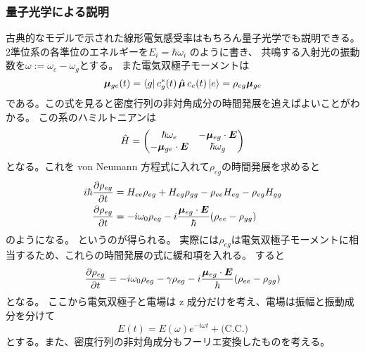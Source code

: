 \documentclass[11pt,dvipdfmx,a4paper]{jsarticle}
\newcommand{\cc}{\text{(C.C.)}}
\begin{document}
\subsubsection{量子光学による説明}
古典的なモデルで示された線形電気感受率はもちろん量子光学でも説明できる。
2準位系の各準位のエネルギーを\(E_i = \hbar \omega_i\) のように書き、
共鳴する入射光の振動数を\(\omega := \omega_e -\omega_g\)とする。
また電気双極子モーメントは
\begin{equation}
	\vb*{\mu}_{ge}(t) = \bra{g}c_g^*(t)\,\hat{\vb*{\mu}}\,c_e(t)\ket{e}
	= \rho_{eg}\vb*{\mu}_{ge}
\end{equation}
である。この式を見ると密度行列の非対角成分の時間発展を追えばよいことがわかる。
この系のハミルトニアンは
\begin{equation}
	\hat{H} =
	\begin{pmatrix}
		\hbar \omega_e  & -\vb*{\mu}_{eg}\cdot\vb*{E}\\
		-\vb*{\mu}_{ge}\cdot\vb*{E} & \hbar \omega_g
	\end{pmatrix}
\end{equation}
となる。これを von Neumann 方程式に入れて\(\rho_{eg}\)の時間発展を求めると
\begin{align}
	i\hbar \pdv{\rho_{eg}}{t} &= H_{ee}\rho_{eg} + H_{eg}\rho_{gg} - \rho_{ee} H_{eg} - \rho_{eg} H_{gg}\\
	\pdv{\rho_{eg}}{t} &= -i\omega_0\rho_{eg} -i\frac{\vb*{\mu}_{eg}\cdot \vb*{E}}{\hbar}(\rho_{ee}-\rho_{gg})
\end{align}
のようになる。
というのが得られる。
実際には\(\rho_{eg}\)は電気双極子モーメントに相当するため、これらの時間発展の式に緩和項を入れる。
すると
\begin{align}
	\pdv{\rho_{eg}}{t} &= -i\omega_0\rho_{eg} -\gamma\rho_{eg} -i\frac{\vb*{\mu}_{eg}\cdot \vb*{E}}{\hbar}(\rho_{ee}-\rho_{gg})\\
\end{align}
となる。
ここから電気双極子と電場は z 成分だけを考え、電場は振幅と振動成分を分けて
\begin{equation}
	E(t) = E(\omega)e^{-i\omega t} + \cc
\end{equation}
とする。また、密度行列の非対角成分もフーリエ変換したものを考える。
\end{document}
